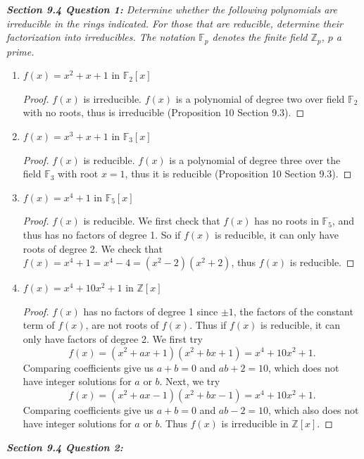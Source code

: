 \documentclass{article}
\begin{document}
\it \textbf{Section 9.4 Question 1:} Determine whether the following
  polynomials are irreducible in the rings indicated. For those that are
  reducible, determine their factorization into irreducibles. The notation
  $\mathbb{F}_p$ denotes the finite field $\mathbb{Z}_p$, $p$ a prime.

  \begin{enumerate}[label={(\alph*)}]
    \item $f(x)=x^2+x+1$ in $\mathbb{F}_2[x]$
      \begin{proof}
        $f(x)$ is irreducible. $f(x)$ is a polynomial of degree two over
        field $\mathbb{F}_2$ with no roots, thus is irreducible
        (Proposition 10 Section 9.3).
      \end{proof}

    \item $f(x)=x^3+x+1$ in $\mathbb{F}_3[x]$
      \begin{proof}
        $f(x)$ is reducible. $f(x)$ is a polynomial of degree three over
        the field $\mathbb{F}_3$ with root $x=1$, thus it is reducible
        (Proposition 10 Section 9.3).
      \end{proof}

    \item $f(x)=x^4+1$ in $\mathbb{F}_5[x]$
      \begin{proof}
        $f(x)$ is reducible. We first check that $f(x)$ has no roots in
        $\mathbb{F}_5$, and thus has no factors of degree 1. So if $f(x)$
        is reducible, it can only have roots of degree 2. We check that
        $f(x)=x^4+1=x^4-4=(x^2-2)(x^2+2)$, thus $f(x)$ is reducible.
      \end{proof}

    \item $f(x)=x^4+10x^2+1$ in $\mathbb{Z}[x]$
      \begin{proof}
        $f(x)$ has no factors of degree 1 since $\pm1$, the factors of the
        constant term of $f(x)$, are not roots of $f(x)$. Thus if $f(x)$ is
        reducible, it can only have factors of degree 2. We first try
        \[f(x)= (x^2+ax+1)(x^2+bx+1) =x^4+10x^2+1.\]
        Comparing coefficients give us $a+b=0$ and $ab+2=10$, which does
        not have integer solutions for $a$ or $b$. Next, we try
        \[f(x)= (x^2+ax-1)(x^2+bx-1) =x^4+10x^2+1.\]
        Comparing coefficients give us $a+b=0$ and $ab-2=10$, which also
        does not have integer solutions for $a$ or $b$. Thus $f(x)$ is
        irreducible in $\mathbb{Z}[x]$.
      \end{proof}
  \end{enumerate}

\it \textbf{Section 9.4 Question 2:}
\end{document}
